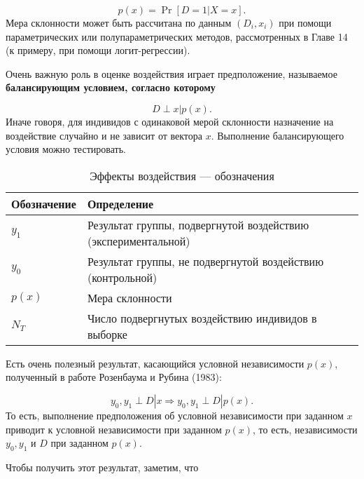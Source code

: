 \begin{equation}
\label{eq25.8}
p(x) = \Pr [D = 1| X = x].
\end{equation}
Мера склонности может быть рассчитана по данным $(D_i, x_i)$ при помощи параметрических или полупараметрических методов, рассмотренных в Главе 14 (к примеру, при помощи логит-регрессии). 

Очень важную роль в оценке воздействия играет предположение, называемое \bfseries балансирующим условием, \mdseries согласно которому

\begin{equation}
\label{eq25.9}
D \perp x | p (x).
\end{equation}
Иначе говоря, для индивидов с одинаковой мерой склонности назначение на воздействие случайно и не зависит от вектора $x$. Выполнение балансирующего условия  можно тестировать. 

\begin{table}[h!]
\caption{\label{tab: } Эффекты воздействия --- обозначения}
\begin{center}
\begin{tabular}{ll}
\hline
\hline
Обозначение & Определение \\
\hline
$y_1$ & Результат группы, подвергнутой воздействию (экспериментальной) \\
$y_0$ & Результат группы, не подвергнутой воздействию (контрольной) \\
$p(x)$ & Мера склонности \\
$N_T$ & Число подвергнутых воздействию индивидов в выборке \\
\hline
\hline
\end{tabular}
\end{center}
\end{table}

Есть очень полезный результат, касающийся условной независимости $p(x)$, полученный в работе Розенбаума и Рубина (1983):

\begin{equation}
\label{eq25.10}
y_0, y_1 \perp D | x \Rightarrow y_0, y_1 \perp D | p(x).
\end{equation}
То есть, выполнение предположения об условной независимости при заданном $x$ приводит к условной независимости при заданном $p(x)$, то есть, независимости $y_0, y_1$ и $D$ при заданном $p(x)$. 

Чтобы получить этот результат, заметим, что 

